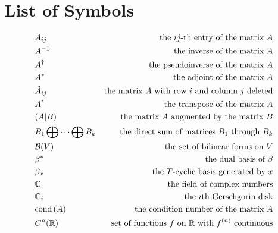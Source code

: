 \chapter{List of Symbols}
\begin{align*}
	 & A_{ij}                            & \text{the $ij$-th entry of the matrix $A$}                                       \\
	 & A^{-1}                            & \text{the inverse of the matrix $A$}                                             \\
	 & A^\dag                            & \text{the pseudoinverse of the matrix $A$}                                       \\
	 & A^*                               & \text{the adjoint of the matrix $A$}                                             \\
	 & \tilde{A}_{ij}                    & \text{the matrix $A$ with row $i$ and column $j$ deleted}                        \\
	 & A^t                               & \text{the transpose of the matrix $A$}                                           \\
	 & (A|B)                             & \text{the matrix $A$ augmented by the matrix $B$}                                \\
	 & B_1 \bigoplus \dots \bigoplus B_k & \text{the direct sum of matrices $B_1$ through $B_k$}                            \\
	 & \mathcal{B}(V)                    & \text{the set of bilinear forms on $V$}                                          \\
	 & \beta^*                           & \text{the dual basis of $\beta$}                                                 \\
	 & \beta_x                           & \text{the $T$-cyclic basis generated by $x$}                                     \\
	 & \C                                & \text{the field of complex numbers}                                              \\
	 & \C_i                              & \text{the $i$th Gerschgorin disk}                                                \\
	 & \cond{A}                          & \text{the condition number of the matrix $A$}                                    \\
	 & C^n(\R)                           & \text{set of functions $f$ on $\R$ with $f^{(n)}$ continuous}                    \\

\end{align*}

